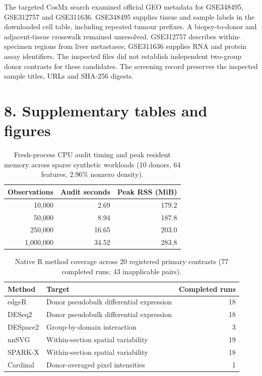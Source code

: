 \documentclass[11pt]{article}
\begin{document}
The targeted CosMx search examined official GEO metadata for GSE348495, GSE312757 and GSE311636. GSE348495 supplies tissue and sample labels in the downloaded cell table, including repeated tumour prefixes. A biopsy-to-donor and adjacent-tissue crosswalk remained unresolved. GSE312757 describes within-specimen regions from liver metastases; GSE311636 supplies RNA and protein assay identifiers. The inspected files did not establish independent two-group donor contrasts for these candidates. The screening record preserves the inspected sample titles, URLs and SHA-256 digests.

\section*{8. Supplementary tables and figures}

\begin{table}[htbp]\centering\small
\caption{Fresh-process CPU audit timing and peak resident memory across sparse synthetic workloads (10 donors, 64 features, 2.96\% nonzero density).}\label{tab:s-scaling}
\begin{tabular}{rrr}\toprule
Observations & Audit seconds & Peak RSS (MiB)\\\midrule
10,000 & 2.69 & 179.2\\
50,000 & 8.94 & 187.8\\
250,000 & 16.65 & 203.0\\
1,000,000 & 34.52 & 283.8\\
\bottomrule\end{tabular}
\end{table}

\begin{table}[htbp]\centering\small
\caption{Native R method coverage across 20 registered primary contrasts (77 completed runs; 43 inapplicable pairs).}\label{tab:s-comparators}
\begin{tabular}{@{}llr@{}}\toprule
Method & Target & Completed runs\\\midrule
edgeR & Donor pseudobulk differential expression & 18\\
DESeq2 & Donor pseudobulk differential expression & 18\\
DESpace2 & Group-by-domain interaction & 3\\
nnSVG & Within-section spatial variability & 19\\
SPARK-X & Within-section spatial variability & 18\\
Cardinal & Donor-averaged pixel intensities & 1\\
\bottomrule\end{tabular}
\end{table}
\end{document}
